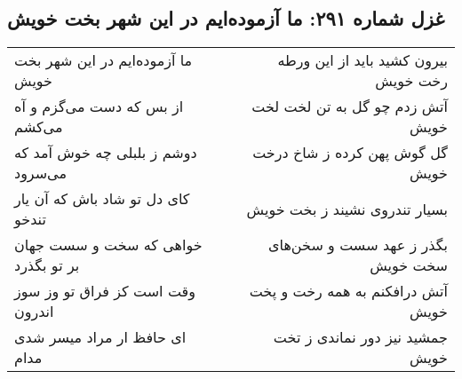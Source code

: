 \begin{center}
\section*{غزل شماره ۲۹۱: ما آزموده‌ایم در این شهر بخت خویش}
\label{sec:sh291}
\begin{longtable}{l p{0.5cm} r}
ما آزموده‌ایم در این شهر بخت خویش
&&
بیرون کشید باید از این ورطه رخت خویش
\\
از بس که دست می‌گزم و آه می‌کشم
&&
آتش زدم چو گل به تن لخت لخت خویش
\\
دوشم ز بلبلی چه خوش آمد که می‌سرود
&&
گل گوش پهن کرده ز شاخ درخت خویش
\\
کای دل تو شاد باش که آن یار تندخو
&&
بسیار تندروی نشیند ز بخت خویش
\\
خواهی که سخت و سست جهان بر تو بگذرد
&&
بگذر ز عهد سست و سخن‌های سخت خویش
\\
وقت است کز فراق تو وز سوز اندرون
&&
آتش درافکنم به همه رخت و پخت خویش
\\
ای حافظ ار مراد میسر شدی مدام
&&
جمشید نیز دور نماندی ز تخت خویش
\\
\end{longtable}
\end{center}
